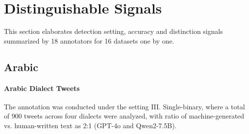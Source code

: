 

\section{Distinguishable Signals}
\label{sec:distinctionfactor}
This section elaborates detection setting, accuracy and distinction signals summarized by 18 annotators for 16 datasets one by one.

\begin{table}[t!]
    \centering
    \caption{Arabic dialect tweet human detection accuracy over human vs. \gptfouro vs. \qwentwo-7.5B. Machine-generated text is harder than human text to discern. \gptfouro is harder than \qwentwo.}
    \label{tab:arabic-dialect_tweet-accuracy}
\end{table}

\subsection{Arabic}
\label{sec: arabic_insights}
\paragraph{Arabic Dialect Tweets}
The annotation was conducted under the setting III. Single-binary, where a total of 900 tweets across four dialects were analyzed, with ratio of machine-generated vs. human-written text as 2:1 (GPT-4o and Qwen2-7.5B).

